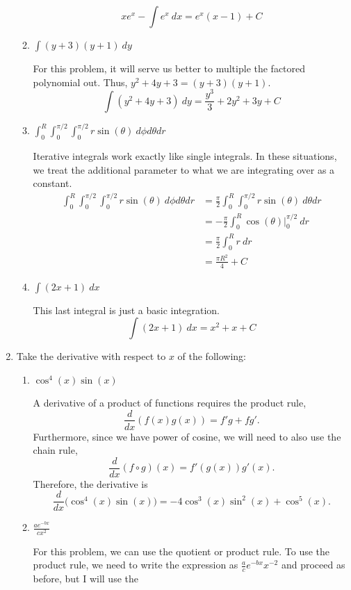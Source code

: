 \begin{enumerate}
\begin{enumerate}[label = (\alph*), ref = \theenumi{(\alph*)}]
    \[
    xe^x - \int e^x \ dx = e^x(x - 1) + C
    \]
  \item
    \(\int(y + 3)(y + 1) \ dy\)
    \par\smallskip
    For this problem, it will serve us better to multiple the factored
    polynomial out.
    Thus, \(y^2 + 4y + 3 = (y + 3)(y + 1)\).
    \[
    \int(y^2 + 4y + 3) \ dy = \frac{y^3}{3} + 2y^2 + 3y + C
    \]
  \item
    \(\int_0^R\int_0^{\pi/2}\int_0^{\pi/2}r\sin(\theta) \ d\phi d\theta dr\)
    \par\smallskip
    Iterative integrals work exactly like single integrals.
    In these situations, we treat the additional parameter to what we are
    integrating over as a constant.
    \begin{align*}
      \int_0^R\int_0^{\pi/2}\int_0^{\pi/2}r\sin(\theta) \ d\phi d\theta dr
      &= \frac{\pi}{2}\int_0^R\int_0^{\pi/2}r\sin(\theta) \ d\theta dr\\
      &= -\frac{\pi}{2}\int_0^R\cos(\theta)\big|_0^{\pi/2} \ dr\\
      &= \frac{\pi}{2}\int_0^Rr \ dr\\
      &= \frac{\pi R^2}{4} + C
    \end{align*}
  \item
    \(\int(2x + 1) \ dx\)
    \par\smallskip
    This last integral is just a basic integration.
    \[
    \int(2x + 1) \ dx = x^2 + x + C
    \]
  \end{enumerate}
\item
  Take the derivative with respect to \(x\) of the following:
  \begin{enumerate}[label = (\alph*)]
  \item
    \(\cos^4(x)\sin(x)\)
    \par\smallskip
    A derivative of a product of functions requires the product rule,
    \[
    \frac{d}{dx}(f(x)g(x)) = f'g + fg'.
    \]
    Furthermore, since we have power of cosine, we will need to also use the
    chain rule,
    \[
    \frac{d}{dx}(f\circ g)(x) = f'(g(x))g'(x).
    \]
    Therefore, the derivative is
    \[
    \frac{d}{dx}\big(\cos^4(x)\sin(x)\big) =
    -4\cos^3(x)\sin^2(x) + \cos^5(x).
    \]
  \item
    \(\frac{ae^{-bx}}{cx^2}\)
    \par\smallskip
    For this problem, we can use the quotient or product rule.
    To use the product rule, we need to write the expression as
    \(\frac{a}{c}e^{-bx}x^{-2}\) and proceed as before, but I will use the

\end{enumerate}
\end{enumerate}
